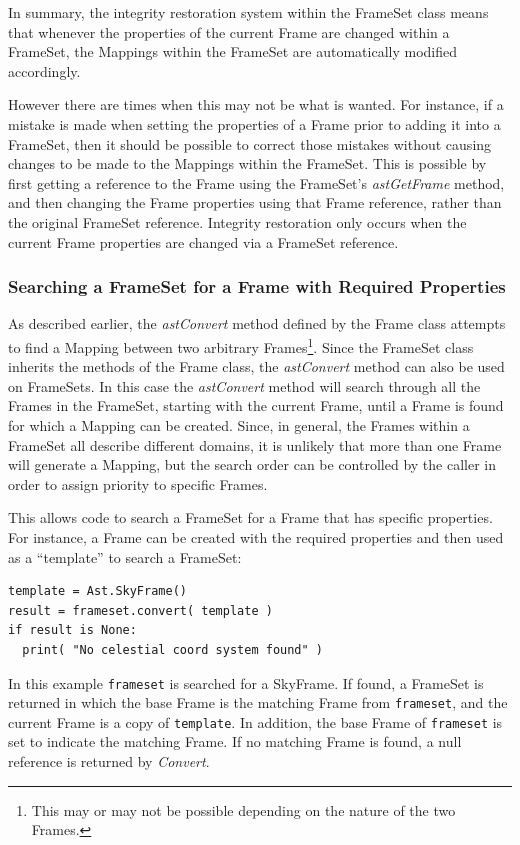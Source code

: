 \documentclass[final,authoryear,5p,times,twocolumn]{elsarticle}
\begin{document}
In summary, the integrity restoration system within the FrameSet class
means that whenever the properties of the current Frame are changed within a
FrameSet, the Mappings within the FrameSet are automatically modified
accordingly.

However there are times when this may not be what is wanted. For
instance, if a mistake is made when setting the properties of a Frame
prior to adding it into a FrameSet, then it should be possible to correct
those mistakes without causing changes to be made to the Mappings within
the FrameSet. This is possible by first getting a reference to the Frame
using the FrameSet's \emph{astGetFrame} method, and then changing the Frame
properties using that Frame reference, rather than the original FrameSet
reference. Integrity restoration only occurs when the current Frame properties
are changed via a FrameSet reference.

\subsubsection{Searching a FrameSet for a Frame with Required Properties}
As described earlier, the \emph{astConvert} method defined by the Frame
class attempts to find a Mapping between two arbitrary
Frames\footnote{This may or may not be possible depending on the nature
of the two Frames.}. Since the FrameSet class inherits the methods of the
Frame class, the \emph{astConvert} method can also be used on FrameSets. In
this case the \emph{astConvert} method will search through all the Frames
in the FrameSet, starting with the current Frame, until a Frame is found
for which a Mapping can be created. Since, in general, the Frames within a
FrameSet all describe different domains, it is unlikely that more than one
Frame will generate a Mapping, but the search order can be controlled by
the caller in order to assign priority to specific Frames.

This allows code to search a FrameSet for a Frame that has specific
properties. For instance, a Frame can be created with the required
properties and then used as a ``template'' to search a FrameSet:

\begin{lstlisting}
template = Ast.SkyFrame()
result = frameset.convert( template )
if result is None:
  print( "No celestial coord system found" )
\end{lstlisting}

In this example \texttt{frameset} is searched for a SkyFrame. If found, a
FrameSet is returned in which the base Frame is the matching Frame from
\texttt{frameset}, and the current Frame is a copy of \texttt{template}.
In addition, the base Frame of \texttt{frameset} is set to indicate the
matching Frame. If no matching Frame is found, a null reference is
returned by \emph{Convert}.
\end{document}

